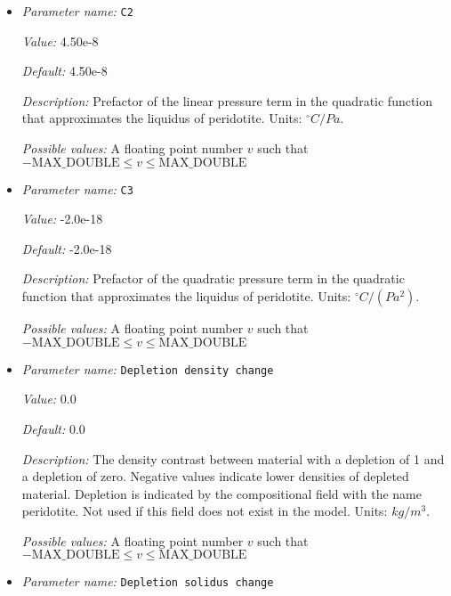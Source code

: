 \begin{itemize}
{\it Possible values:} A floating point number $v$ such that $-\text{MAX\_DOUBLE} \leq v \leq \text{MAX\_DOUBLE}$
\item {\it Parameter name:} {\tt C2}
\label{parameters:Material model/Melt simple/C2}


{\it Value:} 4.50e-8


{\it Default:} 4.50e-8


{\it Description:} Prefactor of the linear pressure term in the quadratic function that approximates the liquidus of peridotite. Units: ${}^\circ C/Pa$.


{\it Possible values:} A floating point number $v$ such that $-\text{MAX\_DOUBLE} \leq v \leq \text{MAX\_DOUBLE}$
\item {\it Parameter name:} {\tt C3}
\label{parameters:Material model/Melt simple/C3}


{\it Value:} -2.0e-18


{\it Default:} -2.0e-18


{\it Description:} Prefactor of the quadratic pressure term in the quadratic function that approximates the liquidus of peridotite. Units: ${}^\circ C/(Pa^2)$.


{\it Possible values:} A floating point number $v$ such that $-\text{MAX\_DOUBLE} \leq v \leq \text{MAX\_DOUBLE}$
\item {\it Parameter name:} {\tt Depletion density change}
\label{parameters:Material model/Melt simple/Depletion density change}


{\it Value:} 0.0


{\it Default:} 0.0


{\it Description:} The density contrast between material with a depletion of 1 and a depletion of zero. Negative values indicate lower densities of depleted material. Depletion is indicated by the compositional field with the name peridotite. Not used if this field does not exist in the model. Units: $kg/m^3$.


{\it Possible values:} A floating point number $v$ such that $-\text{MAX\_DOUBLE} \leq v \leq \text{MAX\_DOUBLE}$
\item {\it Parameter name:} {\tt Depletion solidus change}
\label{parameters:Material model/Melt simple/Depletion solidus change}



\end{itemize}
